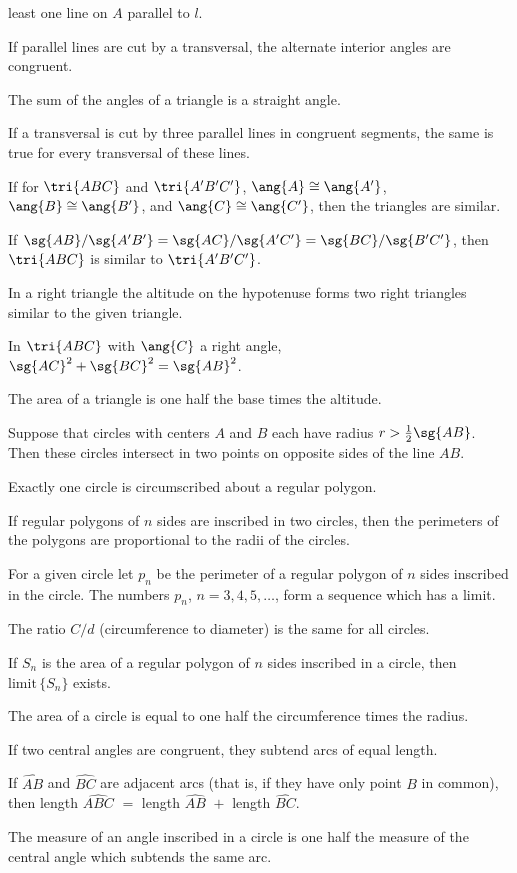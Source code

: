 \documentclass[11pt]{book}
\theoremstyle{bkplain}
\theoremstyle{XIplainnote}
\theoremstyle{bkplain}
\theoremstyle{bkplain}
\begin{document}
\begin{applist}
      least one line on $A$ parallel to $l$.
\item If parallel lines are cut by a transversal, the alternate interior
      angles are congruent.
\item The sum of the angles of a triangle is a straight angle.
\item If a transversal is cut by three parallel lines in congruent segments,
      the same is true for every transversal of these lines.
\item If for $\tri{ABC}$ and $\tri{A'B'C'}$, $\ang{A} \cong \ang{A'}$,
      $\ang{B} \cong \ang{B'}$, and $\ang{C} \cong \ang{C'}$, then the
      triangles are similar.
\item If $\sg{AB}/\sg{A'B'} = \sg{AC}/\sg{A'C'} = \sg{BC}/\sg{B'C'}$, then
      $\tri{ABC}$ is similar to $\tri{A'B'C'}$.
\item In a right triangle the altitude on the hypotenuse forms two right
      triangles similar to the given triangle.
\item In $\tri{ABC}$ with $\ang{C}$ a right angle,
      $\sg{AC}^2 + \sg{BC}^2 = \sg{AB}^2$.
\item The area of a triangle is one half the base times the altitude.
\item Suppose that circles with centers $A$ and $B$ each have radius
      $r > \frac{1}{2}\sg{AB}$. Then these circles intersect in two points
      on opposite sides of the line $AB$.
\item Exactly one circle is circumscribed about a regular polygon.
\item If regular polygons of $n$ sides are inscribed in two circles, then
      the perimeters of the polygons are proportional to the radii of the
      circles.
\item For a given circle let $p_n$ be the perimeter of a regular polygon of
      $n$ sides inscribed in the circle. The numbers $p_n$,
      $n = 3, 4, 5, \ldots$, form a sequence which has a limit.
\item The ratio $C/d$ (circumference to diameter) is the same for all
      circles.
\item If $S_n$ is the area of a regular polygon of $n$ sides inscribed in a
      circle, then $\mathrm{limit}\, \{S_n\}$ exists.
\item The area of a circle is equal to one half the circumference times the
      radius.
\item If two central angles are congruent, they subtend arcs of equal
      length.
\item If $\widehat{AB}$ and $\widehat{BC}$ are adjacent arcs (that is, if
      they have only point $B$ in common), then length $\widehat{ABC}$
      ${}={}$ length $\widehat{AB}$ ${}+{}$ length $\widehat{BC}$.
\item The measure of an angle inscribed in a circle is one half the measure
      of the central angle which subtends the same arc.
\end{applist}
\clearpage
\setcounter{theorem}{0}\setcounter{definition}{0}\setcounter{construction}{0}\setcounter{exgroup}{0}\setcounter{footnote}{0}
\setcounter{chapter}{18}
\end{document}
